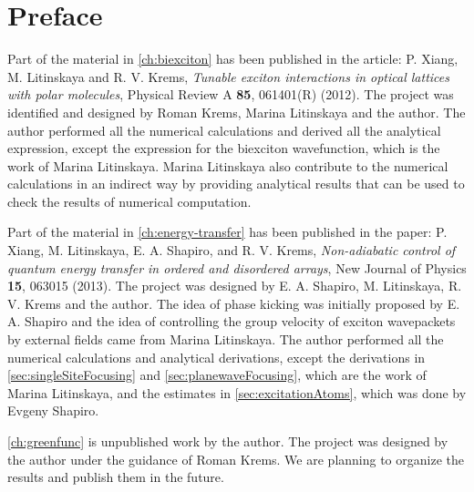 
\chapter{Preface}

Part of the material in \autoref{ch:biexciton} has been published in the article: P. Xiang, M. Litinskaya and R. V. Krems, \textit{ Tunable exciton 
interactions in optical lattices with polar molecules}, Physical Review A {\bf 85}, 061401(R) (2012). The project was identified and 
designed by Roman Krems,  Marina Litinskaya and  the author. The author performed all the numerical calculations and
derived all the analytical expression, except the expression for the biexciton wavefunction, which is the work of Marina 
Litinskaya. Marina Litinskaya also contribute to the numerical calculations in an indirect way by providing analytical 
results that can be used to check the results of numerical computation. 

Part of the material in \autoref{ch:energy-transfer} has been published in the paper: P. Xiang, M. Litinskaya, E. A. Shapiro, and R. V. Krems, 
 \textit{ Non-adiabatic control of quantum energy transfer in ordered and disordered arrays}, 
 New Journal of Physics {\bf 15}, 063015 (2013).  
The project was designed by E. A. Shapiro, M. Litinskaya, R. V. Krems and the author. The idea of phase kicking was initially
proposed by E. A. Shapiro and the idea of controlling the group velocity of exciton wavepackets by external fields came 
from Marina Litinskaya. The author performed all the numerical calculations and analytical derivations, except the 
derivations in \autoref{sec:singleSiteFocusing} and \autoref{sec:planewaveFocusing}, which are the work of Marina Litinskaya, and the estimates in \autoref{sec:excitationAtoms}, which was done by  Evgeny Shapiro. 

\autoref{ch:greenfunc} is unpublished work by the author. The project was designed by the author under the guidance of
Roman Krems. We are planning to organize the results and publish them in the future. 